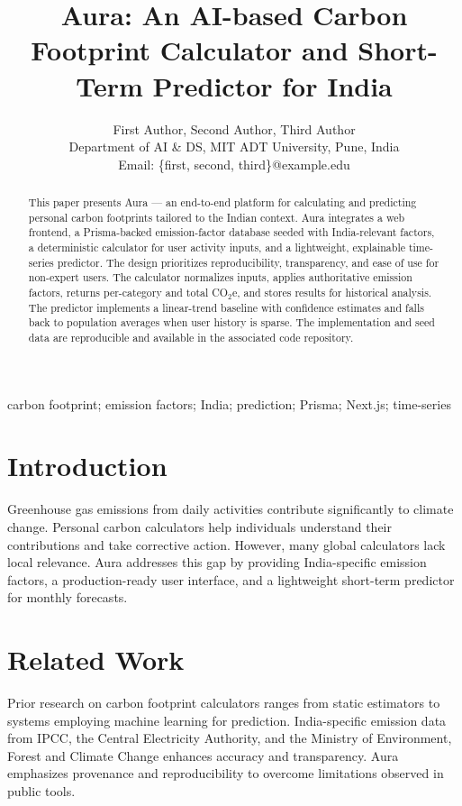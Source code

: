\documentclass[journal]{IEEEtran}
\title{Aura: An AI-based Carbon Footprint Calculator and Short-Term Predictor for India}
\author{First Author, Second Author, Third Author\\
Department of AI \& DS, MIT ADT University, Pune, India\\
Email: \{first, second, third\}@example.edu}%
\begin{document}
\maketitle

\begin{abstract}
This paper presents Aura — an end-to-end platform for calculating and predicting personal carbon footprints tailored to the Indian context. Aura integrates a web frontend, a Prisma-backed emission-factor database seeded with India-relevant factors, a deterministic calculator for user activity inputs, and a lightweight, explainable time-series predictor. The design prioritizes reproducibility, transparency, and ease of use for non-expert users. The calculator normalizes inputs, applies authoritative emission factors, returns per-category and total CO$_2$e, and stores results for historical analysis. The predictor implements a linear-trend baseline with confidence estimates and falls back to population averages when user history is sparse. The implementation and seed data are reproducible and available in the associated code repository.
\end{abstract}

\begin{IEEEkeywords}
carbon footprint; emission factors; India; prediction; Prisma; Next.js; time-series
\end{IEEEkeywords}

\section{Introduction}
Greenhouse gas emissions from daily activities contribute significantly to climate change. Personal carbon calculators help individuals understand their contributions and take corrective action. However, many global calculators lack local relevance. Aura addresses this gap by providing India-specific emission factors, a production-ready user interface, and a lightweight short-term predictor for monthly forecasts.

\section{Related Work}
Prior research on carbon footprint calculators ranges from static estimators to systems employing machine learning for prediction. India-specific emission data from IPCC, the Central Electricity Authority, and the Ministry of Environment, Forest and Climate Change enhances accuracy and transparency. Aura emphasizes provenance and reproducibility to overcome limitations observed in public tools.
\end{document}
